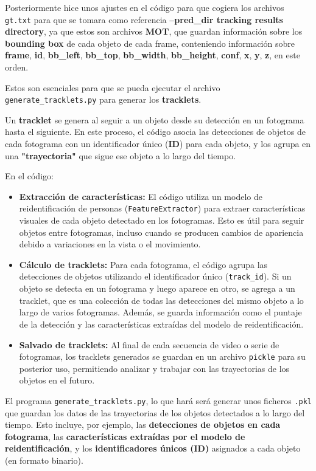\documentclass[12pt, a4paper, twoside]{article}
\begin{document}
	Posteriormente hice unos ajustes en el código para que cogiera los archivos \texttt{gt.txt} para que se tomara como referencia \textbf{--pred\_dir {tracking results directory}}, ya que estos son archivos \textbf{MOT}, que guardan información sobre los \textbf{bounding box} de cada objeto de cada frame, conteniendo información sobre \textbf{frame}, \textbf{id}, \textbf{bb\_left}, \textbf{bb\_top}, \textbf{bb\_width}, \textbf{bb\_height}, \textbf{conf}, \textbf{x}, \textbf{y}, \textbf{z}, en este orden.
	
	Estos son esenciales para que se pueda ejecutar el archivo \texttt{generate\_tracklets.py} para generar los \textbf{tracklets}.
	
	Un \textbf{tracklet} se genera al seguir a un objeto desde su detección en un fotograma hasta el siguiente. En este proceso, el código asocia las detecciones de objetos de cada fotograma con un identificador único (\textbf{ID}) para cada objeto, y los agrupa en una \textbf{"trayectoria"} que sigue ese objeto a lo largo del tiempo.
	
	En el código:
	
	\begin{itemize}
		\item \textbf{Extracción de características:} El código utiliza un modelo de reidentificación de personas (\texttt{FeatureExtractor}) para extraer características visuales de cada objeto detectado en los fotogramas. Esto es útil para seguir objetos entre fotogramas, incluso cuando se producen cambios de apariencia debido a variaciones en la vista o el movimiento.
		\item \textbf{Cálculo de tracklets:} Para cada fotograma, el código agrupa las detecciones de objetos utilizando el identificador único (\texttt{track\_id}). Si un objeto se detecta en un fotograma y luego aparece en otro, se agrega a un tracklet, que es una colección de todas las detecciones del mismo objeto a lo largo de varios fotogramas. Además, se guarda información como el puntaje de la detección y las características extraídas del modelo de reidentificación.
		\item \textbf{Salvado de tracklets:} Al final de cada secuencia de video o serie de fotogramas, los tracklets generados se guardan en un archivo \texttt{pickle} para su posterior uso, permitiendo analizar y trabajar con las trayectorias de los objetos en el futuro.
	\end{itemize}
	
	El programa \texttt{generate\_tracklets.py}, lo que hará será generar unos ficheros \texttt{.pkl} que guardan los datos de las trayectorias de los objetos detectados a lo largo del tiempo. Esto incluye, por ejemplo, las \textbf{detecciones de objetos en cada fotograma}, las \textbf{características extraídas por el modelo de reidentificación}, y los \textbf{identificadores únicos (ID)} asignados a cada objeto (en formato binario).
	
\end{document}
